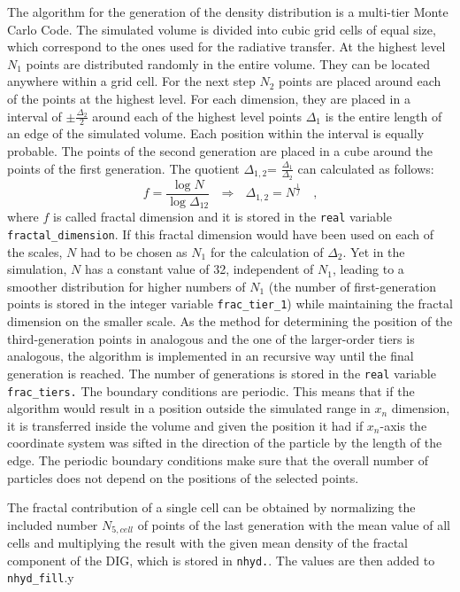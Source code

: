 \documentclass[a4paper,10pt]{article}
\begin{document}
\begin{appendix}
The algorithm for the generation of the density distribution is a multi-tier 
Monte Carlo Code. The simulated volume is divided into cubic grid  cells of 
equal size, which correspond to the ones used for the radiative transfer.
At the highest level \(N_1\) points are distributed randomly in the 
entire volume. They can be located anywhere within a grid cell. For the next 
step \(N_2\) points are placed around each of the points at the highest level. 
For each dimension, they are placed in a interval of \(\pm \frac{\Delta_2}{2}\) 
around each of the highest level points \(\Delta_1\) is the entire length of an 
edge of the simulated volume. Each position within the interval is equally 
probable. The points of the second generation are placed  in a cube around the 
points of the first generation. 
The quotient \(\Delta_{1,2}\)= \(\frac{\Delta_1}{\Delta_2}\) can calculated as 
follows:
\begin{equation}
 f= \frac{\log N}{\log \Delta_{1 2}}~~~\Longrightarrow ~~~ \Delta_{1,2} = 
N^{\frac{1}{f}}\mbox{~~~,}
\end{equation}
where \(f\) is called fractal dimension and it is stored in the \texttt{real} 
variable \texttt{fractal\_dimension}.  If this fractal dimension would have 
been used on each of the scales, \(N\) had to be chosen as \(N_1\) for the 
calculation of \(\Delta_2\). Yet in the simulation, \(N\) has a constant value 
of 32, independent of \(N_1\), leading to a smoother distribution for higher 
numbers of \(N_1\) (the number of first-generation points is stored in the 
integer variable \texttt{frac\_tier\_1}) while maintaining the fractal 
dimension on the smaller scale. As the method for determining the position of 
the third-generation points in analogous and the one of the larger-order tiers 
is analogous, the algorithm is implemented in an recursive way until the final 
generation is reached.  
The number of generations is stored in the \texttt{real} variable 
\texttt{frac\_tiers.}
The boundary conditions are periodic. This means that if the algorithm would 
result in a position outside the simulated range in \(x_n\) dimension, it is 
transferred inside the volume and given the position it  had if \(x_n\)-axis the 
coordinate system was sifted in the direction of the particle by the length of 
the edge. The periodic boundary conditions make sure that the overall number of 
particles does not depend on the positions of the selected points.  

The fractal contribution of a single cell can be obtained by normalizing the 
included number \(N_{5,cell}\)  of points of the last 
generation with the mean value of all cells and multiplying the result with the 
given mean density of the fractal component of the DIG, which is stored in 
\texttt{nhyd.}. The values are then added to \texttt{nhyd\_fill}.y
    


\end{appendix}
\end{document}
